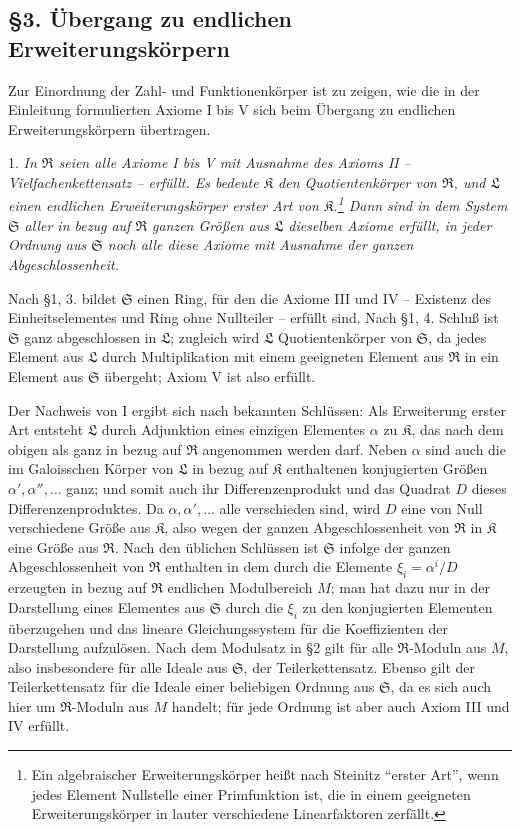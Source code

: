 \documentclass[11pt]{article}
\providecommand{\mR}{\mathfrak{R}}
\providecommand{\mK}{\mathfrak{K}}
\providecommand{\mL}{\mathfrak{L}}
\providecommand{\mS}{\mathfrak{S}}
\begin{document}
\setcounter{footnote}{13}

\subsection*{§3. Übergang zu endlichen Erweiterungskörpern}

Zur Einordnung der Zahl- und Funktionenkörper ist zu zeigen, wie die in der Einleitung formulierten Axiome I bis V sich beim Übergang zu endlichen Erweiterungskörpern übertragen.

1. \emph{In $\mR$ seien alle Axiome I bis V mit Ausnahme des Axioms II -- Vielfachenkettensatz -- erfüllt. Es bedeute $\mK$ den Quotientenkörper von $\mR$, und $\mL$ einen endlichen Erweiterungskörper erster Art von $\mK$.\footnote{Ein algebraischer Erweiterungskörper heißt nach Steinitz ``erster Art'', wenn jedes Element Nullstelle einer Primfunktion ist, die in einem geeigneten Erweiterungskörper in lauter verschiedene Linearfaktoren zerfällt.} Dann sind in dem System $\mS$ aller in bezug auf $\mR$ ganzen Größen aus $\mL$ dieselben Axiome erfüllt, in jeder Ordnung aus $\mS$ noch alle diese Axiome mit Ausnahme der ganzen Abgeschlossenheit.}

Nach §1, 3. bildet $\mS$ einen Ring, für den die Axiome III und IV -- Existenz des Einheitselementes und Ring ohne Nullteiler -- erfüllt sind. Nach §1, 4. Schluß ist $\mS$ ganz abgeschlossen in $\mL$; zugleich wird $\mL$ Quotientenkörper von $\mS$, da jedes Element aus $\mL$ durch Multiplikation mit einem geeigneten Element aus $\mR$ in ein Element aus $\mS$ übergeht; Axiom V ist also erfüllt.

Der Nachweis von I ergibt sich nach bekannten Schlüssen: Als Erweiterung erster Art entsteht $\mL$ durch Adjunktion eines einzigen Elementes $\alpha$ zu $\mK$, das nach dem obigen als ganz in bezug auf $\mR$ angenommen werden darf. Neben $\alpha$ sind auch die im Galoisschen Körper von $\mL$ in bezug auf $\mK$ enthaltenen konjugierten Größen $\alpha',\alpha'',\ldots$ ganz; und somit auch ihr Differenzenprodukt und das Quadrat $D$ dieses Differenzenproduktes. Da $\alpha,\alpha',\ldots$ alle verschieden sind, wird $D$ eine von Null verschiedene Größe aus $\mK$, also wegen der ganzen Abgeschlossenheit von $\mR$ in $\mK$ eine Größe aus $\mR$. Nach den üblichen Schlüssen ist $\mS$ infolge der ganzen Abgeschlossenheit von $\mR$ enthalten in dem durch die Elemente $\xi_i=\alpha^i/D$ erzeugten in bezug auf $\mR$ endlichen Modulbereich $M$; man hat dazu nur in der Darstellung eines Elementes aus $\mS$ durch die $\xi_i$ zu den konjugierten Elementen überzugehen und das lineare Gleichungssystem für die Koeffizienten der Darstellung aufzulösen. Nach dem Modulsatz in §2 gilt für alle $\mR$-Moduln aus $M$, also insbesondere für alle Ideale aus $\mS$, der Teilerkettensatz. Ebenso gilt der Teilerkettensatz für die Ideale einer beliebigen Ordnung aus $\mS$, da es sich auch hier um $\mR$-Moduln aus $M$ handelt; für jede Ordnung ist aber auch Axiom III und IV erfüllt.
\end{document}
